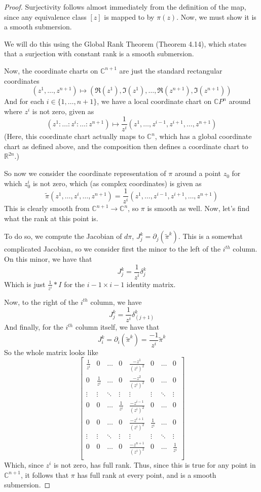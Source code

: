 \documentclass[fontsize=11pt]{scrartcl} %
\numberwithin{equation}{section} %
\numberwithin{figure}{section} %
\numberwithin{table}{section} %
\newcommand{\R}{\mathbb{R}}
\newcommand{\C}{\mathbb{C}}
\begin{document}
\begin{proof}
Surjectivity follows almost immediately from the definition of the map, since any
equivalence class $[z]$ is mapped to by $\pi(z)$. Now, we must show it is a smooth submersion.

We will do this using the Global Rank Theorem (Theorem 4.14), which states that a surjection
with constant rank is a smooth submersion.

Now, the coordinate charts on $\C^{n+1}$ are just the standard rectangular coordinates
\[
(z^1,\ldots,z^{n+1}) \mapsto (\Re(z^1),\Im(z^1),\ldots,\Re(z^{n+1}),\Im(z^{n+1}))
\]
And for each $i\in\{1,\ldots,n+1\}$, we have a local coordinate chart on $\C P^n$ around
where $z^i$ is not zero, given as
\[
(z^1:\ldots:z^i:\ldots:z^{n+1}) \mapsto \frac{1}{z^i}(z^1,\ldots,z^{i-1},z^{i+1},\ldots,z^{n+1})
\]
(Here, this coordinate chart actually maps to $\C^n$, which has a global coordinate chart
as defined above, and the composition then defines a coordinate chart to $\R^{2n}$.)

So now we consider the coordinate representation of $\pi$ around a point $z_0$ for which
$z_0^i$ is not zero, which (as complex coordinates) is given as
\[
\tilde{\pi}(z^1,\ldots,z^i,\ldots,z^{n+1}) = \frac{1}{z^i}(z^1,\ldots,z^{i-1},z^{i+1},\ldots,z^{n+1})
\]
This is clearly smooth from $\C^{n+1}\to\C^n$, so $\pi$ is smooth as well.
Now, let's find what the rank at this point is.

To do so, we compute the Jacobian of $d\pi$, $J_j^k = \partial_j(\tilde{\pi}^k)$.
This is a somewhat complicated Jacobian, so we consider first the minor to the
left of the $i^{th}$ column.  On this minor, we have that
\[
J_j^k = \frac{1}{z^i}\delta_j^k
\]
Which is just $\frac{1}{z^i}*I$ for the $i-1\times i-1$ identity matrix.

Now, to the right of the $i^{th}$ column, we have
\[
J_j^k = \frac{1}{z^i}\delta_{(j+1)}^k
\] 
And finally, for the $i^{th}$ column itself, we have that
\[
J_i^k = \partial_i(\tilde{\pi}^k) = \frac{-1}{z^i}\tilde{\pi}^k
\]
So the whole matrix looks like
\[
\begin{bmatrix}
\frac{1}{z^i} & 0   &\ldots &0 &\frac{-z^1}{(z^i)^2} & 0 & \ldots & 0\\
0 & \frac{1}{z^i}   &\ldots &0 &\frac{-z^2}{(z^i)^2} & 0 & \ldots & 0\\
\vdots & \vdots     &\ddots &\vdots &\vdots          & \vdots & \ddots & \vdots\\
0 & 0               &\ldots &\frac{1}{z^i} &\frac{-z^{i-1}}{(z^i)^2} & 0 &\ldots& 0\\
0 & 0               &\ldots &0 &\frac{-z^{i+1}}{(z^i)^2} & \frac{1}{z^i} &\ldots &0\\
\vdots &\vdots      &\ddots &\vdots &\vdots                   &\vdots &\ddots &\vdots\\
0 & 0               &\ldots &0 &\frac{-z^{n+1}}{(z^i)^2} &0 &\ldots &\frac{1}{z^i}\\ 
\end{bmatrix}
\]
Which, since $z^i$ is not zero, has full rank. Thus, since this is true for any point
in $\C^{n+1}$, it follows that $\pi$ has full rank at every point, and is a smooth submersion.
\end{proof}
\end{document}
